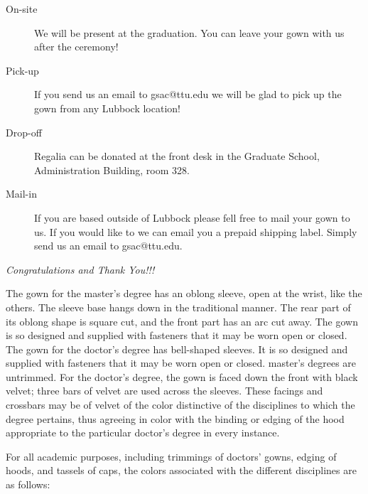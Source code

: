 \documentclass{tufte-handout}
\begin{document}
\begin{description}
\item[On-site] We will be present at the graduation. You can leave your  gown with us after the ceremony!
\item[Pick-up] If you send us an email to gsac@ttu.edu we will be glad to pick up the gown from any Lubbock location!
\item[Drop-off] Regalia can be donated at the front desk in the Graduate School, Administration Building, room 328.
\item[Mail-in] If you are based outside of Lubbock please fell free to mail your gown to us. If you would like to we can email you a prepaid shipping label. Simply send us an email to gsac@ttu.edu.
\end{description}

\begin{fullwidth}
\Huge{\textit{Congratulations and Thank You!!!}}
\end{fullwidth}


The gown for the master's degree has an oblong sleeve, open at the wrist, like the others. The sleeve base hangs down in the traditional manner. The rear part of its oblong shape is square cut, and the front part has an arc cut away. The gown is so designed and supplied with fasteners that it may be worn open or closed. The gown for the doctor's degree has bell-shaped sleeves. It is so designed and supplied with fasteners that it may be worn open or closed.
master's degrees are untrimmed. For the doctor's degree, the gown is faced down the front with black velvet; three bars of velvet are used across the sleeves. These facings and crossbars may be of velvet of the color distinctive of the disciplines to which the degree pertains, thus agreeing in color with the binding or edging of the hood appropriate to the particular doctor's degree in every instance.

For all academic purposes, including trimmings of doctors' gowns, edging of hoods, and tassels of caps, the colors associated with the different disciplines are as follows: 
\end{document}
